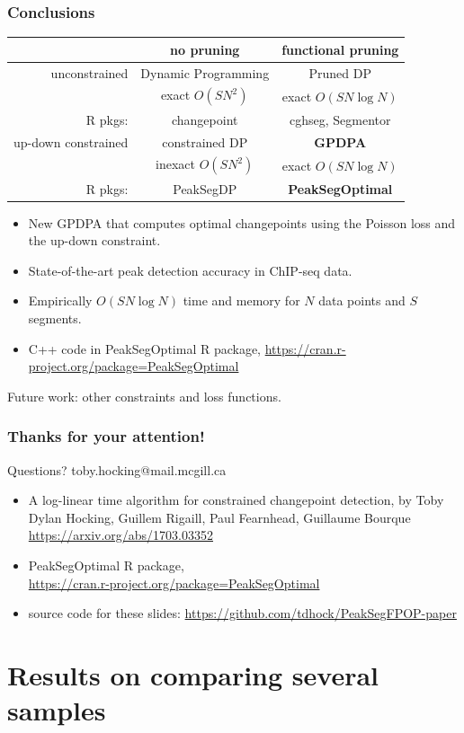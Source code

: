\documentclass{beamer}
\begin{document}
\begin{frame}
  \frametitle{Conclusions}
  \begin{tabular}{r|c|c}
    & no pruning & functional pruning \\
    \hline
    unconstrained & Dynamic Programming & Pruned DP \\
     & exact $O(S N^2)$ & exact $O(SN\log N)$\\
    R pkgs: & changepoint & cghseg, Segmentor\\
    \hline
    up-down constrained & constrained DP & \textbf{GPDPA} \\
     & inexact $O(SN^2)$ & exact $O(SN\log N)$\\
    R pkgs: & PeakSegDP & \textbf{PeakSegOptimal}\\
    \hline
  \end{tabular}
  \begin{itemize}
  \item New GPDPA that computes optimal changepoints 
    using the Poisson loss and the up-down constraint.
  \item State-of-the-art peak detection accuracy in ChIP-seq data.
  \item Empirically $O(S N \log N)$ time and memory for $N$ data
    points and $S$ segments.
  \item C++ code in PeakSegOptimal R package, 
    \url{https://cran.r-project.org/package=PeakSegOptimal}
  \end{itemize}
  Future work: other constraints and loss functions.
\end{frame}

\begin{frame}
  \frametitle{Thanks for your attention!}

  Questions? toby.hocking@mail.mcgill.ca
  \begin{itemize}
  \item A log-linear time algorithm for constrained changepoint
    detection, by Toby Dylan Hocking, Guillem Rigaill, Paul Fearnhead,
    Guillaume Bourque \url{https://arxiv.org/abs/1703.03352}
  \item 
  PeakSegOptimal R package, \\
\url{https://cran.r-project.org/package=PeakSegOptimal}
  \item source code for these slides:
  \url{https://github.com/tdhock/PeakSegFPOP-paper}
  \end{itemize}
\end{frame}

\section*{Results on comparing several samples}
\end{document}
